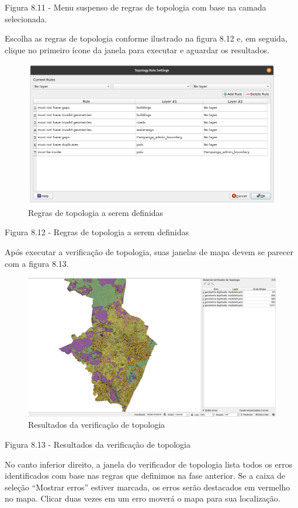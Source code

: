 \documentclass[
  portuguese,
]{krantz}
\begin{document}
Figura 8.11 - Menu suspenso de regras de topologia com base na camada selecionada.

Escolha as regras de topologia conforme ilustrado na figura 8.12 e, em seguida, clique no primeiro ícone da janela para executar e aguardar os resultados.

\begin{figure}
\centering
\includegraphics{media/modulo8/fig812.png}
\caption{Regras de topologia a serem definidas}
\end{figure}

Figura 8.12 - Regras de topologia a serem definidas

Após executar a verificação de topologia, suas janelas de mapa devem se parecer com a figura 8.13.

\begin{figure}
\centering
\includegraphics{media/modulo8/fig813.png}
\caption{Resultados da verificação de topologia}
\end{figure}

Figura 8.13 - Resultados da verificação de topologia

No canto inferior direito, a janela do verificador de topologia lista todos os erros identificados com base nas regras que definimos na fase anterior. Se a caixa de seleção ``Mostrar erros'' estiver marcada, os erros serão destacados em vermelho no mapa. Clicar duas vezes em um erro moverá o mapa para sua localização.
\end{document}
